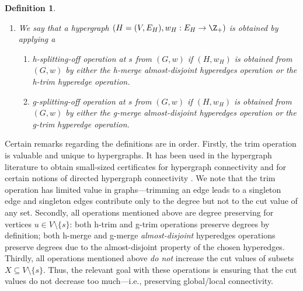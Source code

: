 \documentclass{article}
\newtheorem{definition}{Definition}[section]
\begin{document}
\begin{definition}
\begin{enumerate}
\item We say that a hypergraph $(H=(V, E_H), w_H: E_H\rightarrow \Z_+)$ is obtained by applying a 
        \begin{enumerate}
            \item \emph{h-splitting-off operation at $s$ from $(G, w)$} if $(H, w_H)$ is obtained from $(G, w)$ by either the h-merge almost-disjoint hyperedges operation or the h-trim hyperedge operation. 
            \item \emph{g-splitting-off operation at $s$ from $(G, w)$} if $(H, w_H)$ is obtained from $(G, w)$ by either the g-merge almost-disjoint hyperedges operation or the g-trim hyperedge operation. 
        \end{enumerate}

\end{enumerate}
\end{definition}
Certain remarks regarding the definitions are in order. 
Firstly, the trim operation is valuable and unique to hypergraphs. It has been used in the hypergraph literature to obtain small-sized certificates for hypergraph connectivity \cite{CX18} and for certain notions of directed hypergraph connectivity \cite{Frank-book}. 
We note that the trim operation has limited value in graphs---trimming an edge leads to a singleton edge and singleton edges contribute only to the degree but not to the cut value of any set. 
Secondly, all operations mentioned above are degree preserving for vertices $u\in V\setminus \{s\}$: both h-trim and g-trim operations preserve degrees by definition; both h-merge and g-merge \emph{almost-disjoint} hyperedges operations preserve degrees due to the almost-disjoint property of the chosen hyperedges. 
Thirdly, all operations mentioned above 
\emph{do not} increase the %
cut values of subsets $X\subseteq V\setminus\{s\}$. Thus, the relevant goal with these operations is ensuring that the cut values do not decrease too much---i.e., preserving global/local connectivity. 
\end{document}
